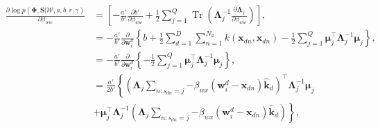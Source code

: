 \documentclass[]{article}
\newcommand{\kernel}[2]{k\left(#1,#2\right)}
\newcommand{\C}{\boldsymbol{\Lambda}_j}
\newcommand{\muJ}{\boldsymbol{\mu}_j}
\newcommand{\W}{\boldsymbol{\mathcal{W}}}
\newcommand{\indobj}{\mathbf{x}_{dn}}
\newcommand{\wIj}[1]{\mathbf{w}_{#1}^d}
\newcommand{\kawx}{\mathbf{\hat{k}}_d }
\newcommand{\likel}{\log p\left(\boldsymbol{\Phi},\mathbf{S}|\W,a,b,r,\gamma\right)}
\begin{document}
\begin{align}
\frac{\partial \likel}{\partial \beta_{ww}} &= \left[-\frac{a'}{b'}\frac{\partial b'}{\partial\beta_{ww}} + \frac{1}{2}\sum_{j=1}^{Q} \operatorname{Tr}\left(\C^{-1}\frac{\partial \C}{\partial \beta_{ww}}\right)\right], \\
& =  -\frac{a'}{b'}\frac{\partial }{\partial \wIj{i}}\left\{b+{\frac{1}{2}}\sum\limits_{d=1}^{D}\sum\limits_{n=1}^{N_d}\kernel{\indobj}{\indobj}-{\frac{1}{2}}\sum\limits_{j=1}^{Q}\boldsymbol{\mu}_j^\top \C^{-1}\muJ\right\}, \\
& =  -\frac{a'}{b'}\frac{\partial }{\partial \wIj{i}}\left\{-{\frac{1}{2}}\sum\limits_{j=1}^{Q}\boldsymbol{\mu}_j^\top \C^{-1}\muJ\right\}, \\
& =  \frac{a'}{2b'} \left\{\left(\C\sum\limits_{n:s_{dn}=j}{-\beta_{wx}\left(\wIj{i}-\indobj\right)\kawx}\right)^\top\C^{-1}\muJ \right. \\
&\left. +   \muJ^\top\C^{-1}\left(\C\sum\limits_{n:s_{dn}=j}{-\beta_{wx}\left(\wIj{i}-\indobj\right)\kawx}\right)
\right\},
\end{align}





\end{document}
